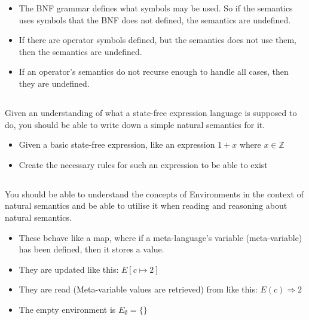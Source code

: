 \begin{itemize}[noitemsep]
\item The BNF grammar defines what symbols may be used. So if the semantics uses symbols that the BNF does not defined, the semantics are undefined.
\item If there are operator symbols defined, but the semantics does not use them, then the semantics are undefined.
\item If an operator's semantics do not recurse enough to handle all cases, then they are undefined.
\end{itemize}

\subsection{}
Given an understanding of what a state-free expression language is supposed to do, you should be able to write down a simple natural semantics for it.

\begin{itemize}[noitemsep]
\item Given a basic state-free expression, like an expression $1 + x$ where $x \in \mathbb{Z}$
\item Create the necessary rules for such an expression to be able to exist
\end{itemize}

\subsection{}
You should be able to understand the concepts of Environments in the context of natural semantics and be able to utilise it when reading and reasoning about natural semantics.

\begin{itemize}[noitemsep]
\item These behave like a map, where if a meta-language's variable (meta-variable) has been defined, then it stores a value.
\item They are updated like this: $E[c \mapsto 2]$
\item They are read (Meta-variable values are retrieved) from like this: $E(c) \Rightarrow 2$
\item The empty environment is $E_{\emptyset} = \lbrace \rbrace$
\end{itemize}

